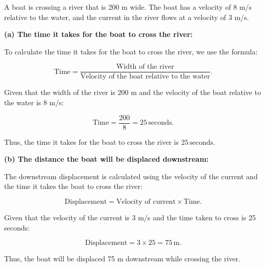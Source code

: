 \documentclass[addpoints]{exam}
\begin{document}
\begin{questions}
\question A boat is crossing a river that is 200 m wide. The boat has a velocity of 8 m/s relative to the water, and the current in the river flows at a velocity of 3 m/s.
\begin{solution}[5cm]
\textbf{(a) The time it takes for the boat to cross the river:}

To calculate the time it takes for the boat to cross the river, we use the formula:

\[
\text{Time} = \frac{\text{Width of the river}}{\text{Velocity of the boat relative to the water}}.
\]

Given that the width of the river is 200 m and the velocity of the boat relative to the water is 8 m/s:

\[
\text{Time} = \frac{200}{8} = 25 \, \text{seconds}.
\]

Thus, the time it takes for the boat to cross the river is \( 25 \, \text{seconds} \).

\textbf{(b) The distance the boat will be displaced downstream:}

The downstream displacement is calculated using the velocity of the current and the time it takes the boat to cross the river:

\[
\text{Displacement} = \text{Velocity of current} \times \text{Time}.
\]

Given that the velocity of the current is 3 m/s and the time taken to cross is 25 seconds:

\[
\text{Displacement} = 3 \times 25 = 75 \, \text{m}.
\]

Thus, the boat will be displaced 75 m downstream while crossing the river.


\end{solution}
\end{questions}
\end{document}
